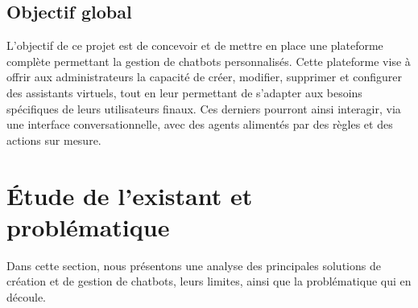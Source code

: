 \subsection{Objectif global}
L’objectif de ce projet est de concevoir et de mettre en place une plateforme complète permettant la gestion de chatbots personnalisés. Cette plateforme vise à offrir aux administrateurs la capacité de créer, modifier, supprimer et configurer des assistants virtuels, tout en leur permettant de s’adapter aux besoins spécifiques de leurs utilisateurs finaux. Ces derniers pourront ainsi interagir, via une interface conversationnelle, avec des agents alimentés par des règles et des actions sur mesure.\\

\section{Étude de l’existant et problématique}
Dans cette section, nous présentons une analyse des principales solutions de création et de gestion de chatbots, leurs limites, ainsi que la problématique qui en découle.
